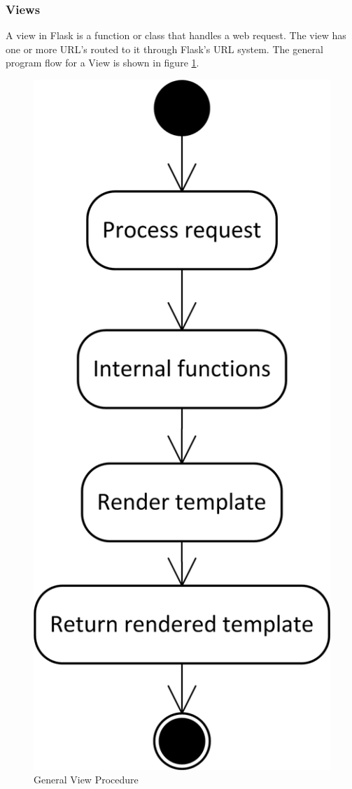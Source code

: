\documentclass{article}
\begin{document}
\subsubsection{Views}
\label{sec:Views}

A view in Flask is a function or class that handles a web request. The view has one or more URL's routed to it through Flask's URL system. The general program flow for a View is shown in figure \ref{fig:ViewProgramFlow}.

\FloatBarrier
\begin{figure}[h!]
\centering
\includegraphics[scale=.75]{img/viewProcedureDiagram}
\caption{General View Procedure}
\label{fig:ViewProgramFlow}
\end{figure}
\FloatBarrier
\end{document}
